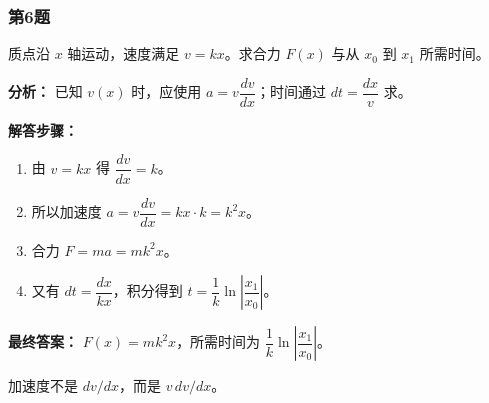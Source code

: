 \documentclass[12pt,a4paper]{ctexart}
\begin{document}
\subsubsection*{第6题}
\begin{tcolorbox}[colback=gray!2!white,colframe=black!60,title={题目}]
质点沿 \(x\) 轴运动，速度满足 \(v=kx\)。求合力 \(F(x)\) 与从 \(x_0\) 到 \(x_1\) 所需时间。\par
\end{tcolorbox}
\begin{tcolorbox}[colback=blue!2!white,colframe=blue!55!black,title={完整答案}]
\textbf{分析：}
已知 \(v(x)\) 时，应使用 \(a=v\dfrac{dv}{dx}\)；时间通过 \(dt=\dfrac{dx}{v}\) 求。\par
\textbf{解答步骤：}
\begin{enumerate}
\item 由 \(v=kx\) 得 \(\dfrac{dv}{dx}=k\)。
\item 所以加速度 \(a=v\dfrac{dv}{dx}=kx\cdot k=k^2x\)。
\item 合力 \(F=ma=mk^2x\)。
\item 又有 \(dt=\dfrac{dx}{kx}\)，积分得到 \(t=\dfrac1k\ln\left|\dfrac{x_1}{x_0}\right|\)。
\end{enumerate}
\textbf{最终答案：}
\(F(x)=mk^2x\)，所需时间为 \(\dfrac1k\ln\left|\dfrac{x_1}{x_0}\right|\)。\par
\end{tcolorbox}
\begin{tcolorbox}[colback=red!2!white,colframe=red!55!black,title={易错点}]
加速度不是 \(dv/dx\)，而是 \(v\,dv/dx\)。\par
\end{tcolorbox}
\end{document}
